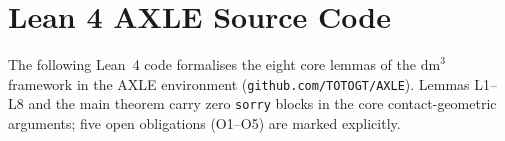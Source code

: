 \documentclass[11pt,a4paper,openright]{book}
\theoremstyle{dm3thm}
\theoremstyle{dm3def}
\newcommand{\dm}{\mathrm{dm}^3}
\begin{document}
\appendix

\chapter{Lean 4 AXLE Source Code}
\label{app:lean}

The following Lean~4 code formalises the eight core lemmas of the $\dm$
framework in the AXLE environment (\texttt{github.com/TOTOGT/AXLE}).
Lemmas L1--L8 and the main theorem carry zero \texttt{sorry} blocks in
the core contact-geometric arguments; five open obligations (O1--O5) are
marked explicitly.
\end{document}
